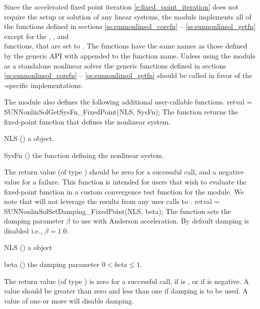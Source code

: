 Since the accelerated fixed point iteration
\eqref{e:fixed_point_iteration} does not require the setup or solution
of any linear systems, the {\sunnonlinsolfixedpoint} module implements
all of the functions defined in sections \ref{ss:sunnonlinsol_corefn} --
\ref{ss:sunnonlinsol_getfn} except for the ,
, and \\ \noindent
{} functions, that are set to .
The {\sunnonlinsolfixedpoint} functions have the same names as those
defined by the generic {\sunnonlinsol} API with 
appended to the function name.  Unless using the
{\sunnonlinsolfixedpoint} module as a standalone nonlinear solver the
generic functions defined in sections \ref{ss:sunnonlinsol_corefn} --
\ref{ss:sunnonlinsol_getfn} should be called in favor of the
{\sunnonlinsolfixedpoint}-specific implementations.

The {\sunnonlinsolfixedpoint} module also defines the following additional
user-callable functions.
{
  retval = SUNNonlinSolGetSysFn\_FixedPoint(NLS, SysFn);
}
{
  The function  returns the fixed-point
  function that defines the nonlinear system.
}
{
  \begin{args}[SysFn]
  \item[NLS] ()
    a {\sunnonlinsol} object.
  \item[SysFn] ()
    the function defining the nonlinear system.
  \end{args}
}
{
  The return value  (of type ) should be zero for a
  successful call, and a negative value for a failure.
}
{
  This function is intended for users that wish to evaluate the
  fixed-point function in a custom convergence test function for the
  {\sunnonlinsolfixedpoint} module. We note that {\sunnonlinsolfixedpoint}
  will not leverage the results from any user calls to .
}
{
  retval = SUNNonlinSolSetDamping\_FixedPoint(NLS, beta);
}
{
  The function  sets the damping
  parameter $\beta$ to use with Anderson acceleration. By default damping
  is disabled i.e., $\beta = 1.0$.
}
{
  \begin{args}[beta]
  \item[NLS] ()
    a {\sunnonlinsol} object
  \item[beta] ()
    the damping parameter $0 < beta \leq 1$.
  \end{args}
}
{
  The return value  (of type ) is zero for a successful call,
   if  is , or
   if  is negative.
}
{
  A  value should be greater than zero and less than one if damping is to
  be used. A value of one or more will disable damping.
}

